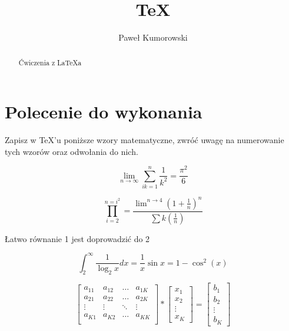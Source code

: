 \documentclass[a4paper,12pt]{article}
\title{\TeX}
\author{Paweł Kumorowski}
\begin{document}
\maketitle

\begin{abstract}
Ćwiczenia z La\TeX a
\end{abstract}

\section{Polecenie do wykonania}
Zapisz w TeX'u poniższe wzory matematyczne, zwróć uwagę na numerowanie tych wzorów oraz odwołania do nich.

\begin{equation}
\lim\limits_{n \to \infty} \sum_{ik=1}^n \frac{1}{k^{2}} = \frac{\pi^{2}}{6}
\end{equation}

\begin{equation}
\prod_{i=2}^{n=i^2}=\frac{\lim\nolimits^{n \to 4}(1+\frac{1}{n})^n}{\sum k(\frac{1}{n})}
\end{equation}

Łatwo równanie 1 jest doprowadzić do 2

\begin{equation}
\int_2^\infty\frac{1}{\log_2x}dx=\frac{1}{x}\sin x=1-\cos^2(x)
\end{equation}

\begin{equation}
\left[\begin{array}{cccc}
a_{11} & a_{12} & \ldots & a_{1K}\\
a_{21} & a_{22} & \ldots & a_{2K}\\
\vdots & \vdots & \ddots &\vdots \\
a_{K1} & a_{K2} & \ldots & a_{KK}\\
\end{array}\right]
*
\left[\begin{array}{c}
x_1 \\
x_2 \\
\vdots \\
x_K
\end{array} \right]
=
\left[\begin{array}{c}
b_1 \\
b_2 \\
\vdots \\
b_K
\end{array}\right]
\end{equation}
\end{document}
